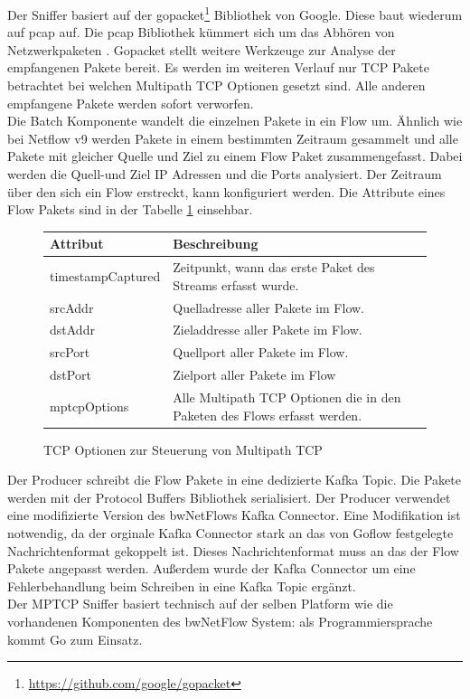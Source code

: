 \documentclass[a4paper, 12pt]{article}
\begin{document}
Der Sniffer basiert auf der gopacket\footnote{\url{https://github.com/google/gopacket}} Bibliothek von Google. Diese baut wiederum auf pcap auf. Die pcap Bibliothek kümmert sich um das Abhören von Netzwerkpaketen \cite{manpcap}. Gopacket stellt weitere Werkzeuge zur Analyse der empfangenen Pakete bereit. Es werden im weiteren Verlauf nur TCP Pakete betrachtet bei welchen Multipath TCP Optionen gesetzt sind. Alle anderen empfangene Pakete werden sofort verworfen.
\\
Die Batch Komponente wandelt die einzelnen Pakete in ein Flow um. Ähnlich wie bei Netflow v9 werden Pakete in einem bestimmten Zeitraum gesammelt und alle Pakete mit gleicher Quelle und Ziel zu einem Flow Paket zusammengefasst. Dabei werden die Quell-und Ziel IP Adressen und die Ports analysiert. Der Zeitraum über den sich ein Flow erstreckt, kann konfiguriert werden. Die Attribute eines Flow Pakets sind in der Tabelle \ref{tbl:mptcp_fields} einsehbar. 

\begin{figure}[H]
\begin{center}
    \begin{tabular}{ | l | p{5cm} |}
    \hline
    \textbf{Attribut} & \textbf{Beschreibung}  \\ \hline
    timestampCaptured & Zeitpunkt, wann das erste Paket des Streams  erfasst wurde.\\ \hline
    srcAddr & Quelladresse aller Pakete im Flow.\\ \hline
    dstAddr & Zieladdresse aller Pakete im Flow.   \\ \hline
    srcPort & Quellport aller Pakete im Flow.   \\ \hline
    dstPort & Zielport aller Pakete im Flow   \\ \hline
    mptcpOptions & Alle Multipath TCP Optionen die in den Paketen des Flows erfasst werden.  \\ \hline
    \end{tabular}
\end{center}    
\caption{TCP Optionen zur Steuerung von Multipath TCP}
\label{tbl:mptcp_fields}
\end{figure}

Der Producer schreibt die Flow Pakete in eine dedizierte Kafka Topic. Die Pakete werden mit der Protocol Buffers Bibliothek serialisiert.
Der Producer verwendet eine modifizierte Version des bwNetFlows Kafka Connector. 
Eine Modifikation ist notwendig, da der orginale Kafka Connector stark an das von Goflow festgelegte Nachrichtenformat gekoppelt ist.
Dieses Nachrichtenformat muss an das der Flow Pakete angepasst werden.
Außerdem wurde der Kafka Connector um eine Fehlerbehandlung beim Schreiben in eine Kafka Topic ergänzt.
\\
Der MPTCP Sniffer basiert technisch auf der selben Platform wie die vorhandenen Komponenten des bwNetFlow System: als Programmiersprache kommt Go zum Einsatz.
\end{document}
